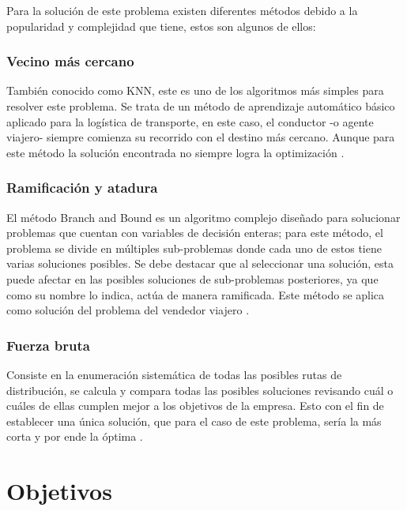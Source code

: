 \documentclass[journal]{IEEEtran}
\begin{document}
        Para la solución de este problema existen diferentes métodos debido a la popularidad y complejidad que tiene, estos son algunos de ellos:
        
        \subsubsection{Vecino más cercano}
        
            También conocido como KNN, este es uno de los algoritmos más simples para resolver este problema. Se trata de un método de aprendizaje automático básico aplicado para la logística de transporte, en este caso, el conductor -o agente viajero- siempre comienza su recorrido con el destino más cercano. Aunque para este método la solución encontrada no siempre logra la optimización \cite{trevelingProb}.

        \subsubsection{Ramificación y atadura}
        
            El método Branch and Bound es un algoritmo complejo diseñado para solucionar problemas que cuentan con variables de decisión enteras; para este método, el problema se divide en múltiples sub-problemas donde cada uno de estos tiene varias soluciones posibles. Se debe destacar que al seleccionar una solución, esta puede afectar en las posibles soluciones de sub-problemas posteriores, ya que como su nombre lo indica, actúa de manera ramificada. Este método se aplica como solución del problema del vendedor viajero \cite{trevelingProb}.

        \subsubsection{Fuerza bruta}
        
            Consiste en la enumeración sistemática de todas las posibles rutas de distribución, se calcula y compara todas las posibles soluciones revisando cuál o cuáles de ellas cumplen mejor a los objetivos de la empresa. Esto con el fin de establecer una única solución, que para el caso de este problema, sería la más corta y por ende la óptima \cite{trevelingProb}.
    
    \section{Objetivos}
\end{document}
